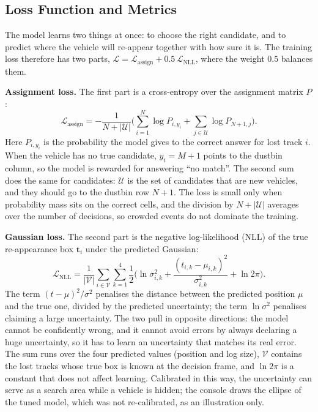 \subsection{Loss Function and Metrics}
\label{sec:loss_metrics}

The model learns two things at once: to choose the right candidate, and to predict where the vehicle will re-appear together with how sure it is. The training loss therefore has two parts, $\mathcal{L} = \mathcal{L}_{\text{assign}} + 0.5\,\mathcal{L}_{\text{NLL}}$, where the weight $0.5$ balances them.

\textbf{Assignment loss.} The first part is a cross-entropy over the assignment matrix $P$:
\begin{equation}
    \mathcal{L}_{\text{assign}} = -\frac{1}{N + |\mathcal{U}|}\Big(\sum_{i=1}^{N} \log P_{i,y_i} + \sum_{j \in \mathcal{U}} \log P_{N+1,j}\Big).
\end{equation}
Here $P_{i,y_i}$ is the probability the model gives to the correct answer for lost track $i$. When the vehicle has no true candidate, $y_i = M+1$ points to the dustbin column, so the model is rewarded for answering ``no match''. The second sum does the same for candidates: $\mathcal{U}$ is the set of candidates that are new vehicles, and they should go to the dustbin row $N+1$. The loss is small only when probability mass sits on the correct cells, and the division by $N + |\mathcal{U}|$ averages over the number of decisions, so crowded events do not dominate the training.

\textbf{Gaussian loss.} The second part is the negative log-likelihood (NLL) of the true re-appearance box $\mathbf{t}_i$ under the predicted Gaussian:
\begin{equation}
    \mathcal{L}_{\text{NLL}} = \frac{1}{|\mathcal{V}|}\sum_{i \in \mathcal{V}} \sum_{k=1}^{4} \frac{1}{2}\Big(\ln\sigma^2_{i,k} + \frac{(t_{i,k}-\mu_{i,k})^2}{\sigma^2_{i,k}} + \ln 2\pi\Big).
\end{equation}
The term $(t-\mu)^2/\sigma^2$ penalises the distance between the predicted position $\mu$ and the true one, divided by the predicted uncertainty; the term $\ln\sigma^2$ penalises claiming a large uncertainty. The two pull in opposite directions: the model cannot be confidently wrong, and it cannot avoid errors by always declaring a huge uncertainty, so it has to learn an uncertainty that matches its real error. The sum runs over the four predicted values (position and log size), $\mathcal{V}$ contains the lost tracks whose true box is known at the decision frame, and $\ln 2\pi$ is a constant that does not affect learning. Calibrated in this way, the uncertainty can serve as a search area while a vehicle is hidden; the console draws the ellipse of the tuned model, which was not re-calibrated, as an illustration only.

